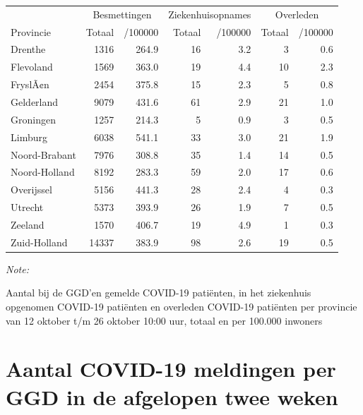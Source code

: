 \documentclass[
  english,
  man,floatsintext]{apa6}
\begin{document}
\begin{table}
\centering
\begin{threeparttable}
\begin{tabular}{lrrrrrr}
\toprule
\multicolumn{1}{c}{ } & \multicolumn{2}{c}{Besmettingen} & \multicolumn{2}{c}{Ziekenhuisopnames} & \multicolumn{2}{c}{Overleden} \\
\cmidrule(l{3pt}r{3pt}){2-3} \cmidrule(l{3pt}r{3pt}){4-5} \cmidrule(l{3pt}r{3pt}){6-7}
Provincie & Totaal & /100000 & Totaal & /100000 & Totaal & /100000\\
\midrule
Drenthe & 1316 & 264.9 & 16 & 3.2 & 3 & 0.6\\
Flevoland & 1569 & 363.0 & 19 & 4.4 & 10 & 2.3\\
FryslÃ¢n & 2454 & 375.8 & 15 & 2.3 & 5 & 0.8\\
Gelderland & 9079 & 431.6 & 61 & 2.9 & 21 & 1.0\\
Groningen & 1257 & 214.3 & 5 & 0.9 & 3 & 0.5\\
Limburg & 6038 & 541.1 & 33 & 3.0 & 21 & 1.9\\
Noord-Brabant & 7976 & 308.8 & 35 & 1.4 & 14 & 0.5\\
Noord-Holland & 8192 & 283.3 & 59 & 2.0 & 17 & 0.6\\
Overijssel & 5156 & 441.3 & 28 & 2.4 & 4 & 0.3\\
Utrecht & 5373 & 393.9 & 26 & 1.9 & 7 & 0.5\\
Zeeland & 1570 & 406.7 & 19 & 4.9 & 1 & 0.3\\
Zuid-Holland & 14337 & 383.9 & 98 & 2.6 & 19 & 0.5\\
\bottomrule
\end{tabular}
\begin{tablenotes}
\item \textit{Note: } 
\item Aantal bij de GGD’en gemelde COVID-19 patiënten, in het ziekenhuis opgenomen COVID-19 patiënten en overleden COVID-19 patiënten per provincie van 12 oktober t/m 26 oktober 10:00 uur, totaal en per 100.000 inwoners
\end{tablenotes}
\end{threeparttable}
\end{table}

\newpage

\hypertarget{aantal-covid-19-meldingen-per-ggd-in-de-afgelopen-twee-weken}{%
\section{Aantal COVID-19 meldingen per GGD in de afgelopen twee weken}\label{aantal-covid-19-meldingen-per-ggd-in-de-afgelopen-twee-weken}}
\end{document}
